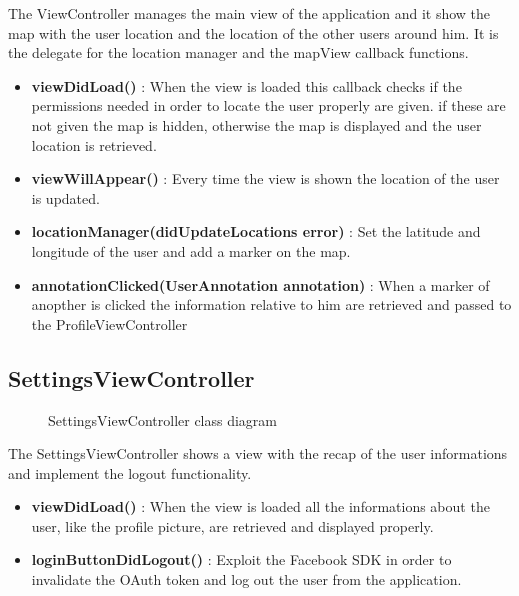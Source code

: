 The ViewController manages the main view of the application and it show the map with the user location and the location of the other users around him. It is the delegate for the location manager and the mapView callback functions.

\begin{itemize}
\item \textbf{viewDidLoad()} : When the view is loaded this callback checks if the permissions needed in order to locate the user properly are given. if these are not given the map is hidden, otherwise the map is displayed and the user location is retrieved.
\item \textbf{viewWillAppear()} : Every time the view is shown the location of the user is updated.
\item \textbf{locationManager(didUpdateLocations error)} : Set the latitude and longitude of the user and add a marker on the map.
\item \textbf{annotationClicked(UserAnnotation annotation)} : When a marker of anopther is clicked the information relative to him are retrieved and passed to the ProfileViewController
\end{itemize}

\subsection{SettingsViewController} 
\begin{figure}[H]
\caption{SettingsViewController class diagram}

\end{figure}

The SettingsViewController shows a view with the recap of the user informations and implement the logout functionality.

\begin{itemize}
\item \textbf{viewDidLoad()} : When the view is loaded all the informations about the user, like the profile picture, are retrieved and displayed properly.
\item \textbf{loginButtonDidLogout()} : Exploit the Facebook SDK in order to invalidate the OAuth token and log out the user from the application.
\end{itemize}

